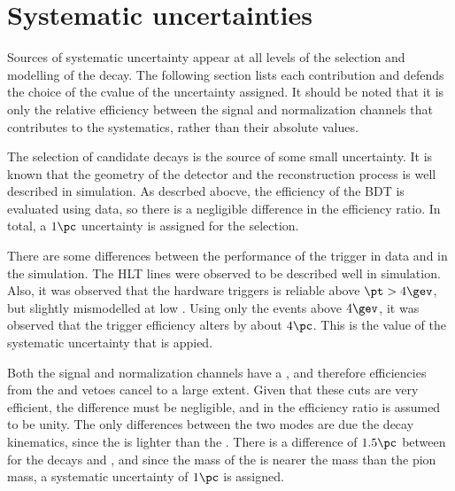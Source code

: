 \section{Systematic uncertainties}
\label{sec:dsphi:syst}

Sources of systematic uncertainty appear at all levels of the selection and modelling of the decay.
The following section lists each contribution and defends the choice of the cvalue of the
uncertainty assigned.
It should be noted that it is only the relative efficiency between the signal and normalization
channels that contributes to the systematics, rather than their absolute values.

The selection of candidate \btodsphi decays is the source of some small uncertainty.
It is known that the geometry of the detector and the reconstruction process is well described in
simulation.
As descrbed abocve, the efficiency of the BDT is evaluated using data, so there is a negligible
difference in the efficiency ratio.
In total, a $1\pc$ uncertainty is assigned for the selection.

There are some differences between the performance of the trigger in data and in the simulation.
The HLT lines were observed to be described well in simulation.
Also, it was observed that the \lone hardware triggers is reliable above $\pt>4\gev$, but slightly
mismodelled at low \pt.
Using only the events above $4\gev$, it was observed that the trigger efficiency alters by about
$4\pc$.
This is the value of the systematic uncertainty that is appied.

Both the signal and normalization channels have a \Ds, and therefore efficiencies from the \Dp and
\Lc vetoes cancel to a large extent.
Given that these cuts are very efficient, the difference must be negligible, and in
 the efficiency ratio is assumed to be unity.
The only differences between the two modes are due the decay kinematics, since the \phii is lighter
than the \Dz.
There is a difference of $1.5\pc$ between  for the decays \bstodspi and \btodsd, and
since the mass of the \phii is nearer the \Dz mass than the pion mass, a systematic uncertainty of
$1\pc$ is assigned.


